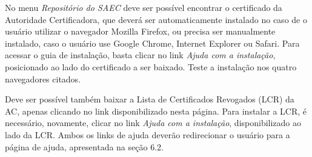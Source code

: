 No menu \textit{Repositório do SAEC} deve ser possível encontrar o certificado da Autoridade Certificadora, que deverá ser automaticamente instalado no caso de o usuário utilizar o navegador Mozilla Firefox, ou precisa ser manualmente instalado, caso o usuário use Google Chrome, Internet Explorer ou Safari. Para acessar o guia de instalação, basta clicar no link \textit{Ajuda com a instalação}, posicionado ao lado do certificado a ser baixado. Teste a instalação nos quatro navegadores citados.

Deve ser possível também baixar a Lista de Certificados Revogados (LCR) da AC, apenas clicando no link disponibilizado nesta página. Para instalar a LCR, é necessário, novamente, clicar no link \textit{Ajuda com a instalação}, disponibilizado ao lado da LCR. Ambos os links de ajuda deverão redirecionar o usuário para a página de ajuda, apresentada na seção 6.2.